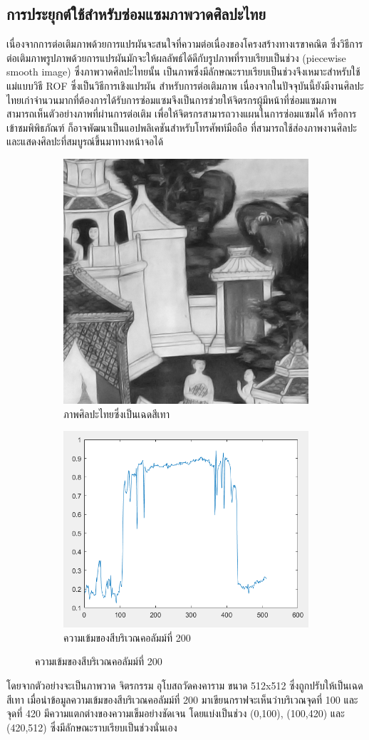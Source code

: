 \documentclass[hidelinks,a4paper,14pt]{article}
\numberwithin{equation}{section}							%
\begin{document}
{		 \subsection{การประยุกต์ใช้สำหรับซ่อมแซมภาพวาดศิลปะไทย}
		 
		 \hspace{1cm}เนื่องจากการต่อเติมภาพด้วยการแปรผันจะสนใจที่ความต่อเนื่องของโครงสร้างทางเรขาคณิต ซึ่งวิธีการต่อเติมภาพรูปภาพด้วยการแปรผันมักจะให้ผลลัพธ์ได้ดีกับรูปภาพที่ราบเรียบเป็นช่วง (piecewise smooth image) \cite{ref:defination-of-variation-inpaint}  ซึ่งภาพวาดศิลปะไทยนั้น เป็นภาพซึ่งมีลักษณะราบเรียบเป็นช่วงจึงเหมาะสำหรับใช้แม่แบบวิธี ROF ซึ่งเป็นวิธีการเชิงแปรผัน สำหรับการต่อเติมภาพ เนื่องจากในปัจจุบันนี้ยังมีงานศิลปะไทยเก่าจำนวนมากที่ต้องการได้รับการซ่อมแซมจึงเป็นการช่วยให้จิตรกรผู้มีหน้าที่ซ่อมแซมภาพ สามารถเห็นตัวอย่างภาพที่ผ่านการต่อเติม เพื่อให้จิตรกรสามารถวางแผนในการซ่อมแซมได้ หรือการเข้าชมพิพิธภัณฑ์ ก็อาจพัฒนาเป็นแอปพลิเคชันสำหรับโทรศัพท์มือถือ ที่สามารถใช้ส่องภาพงานศิลปะและแสดงศิลปะที่สมบูรณ์ขึ้นมาทางหน้าจอได้
		 \begin{figure}[H]
		 	\centering
		 	\begin{subfigure}{0.4\linewidth}
		 		\centering
		 		\includegraphics[width=0.4\linewidth]{images/show_peicewise/thaiart_gray.png}
		 		\caption{ภาพศิลปะไทยซึ่งเป็นเฉดสีเทา}
		 	\end{subfigure}
		 	\begin{subfigure}{0.4\linewidth}
		 		\centering
		 		\includegraphics[width=0.4\linewidth]{images/show_peicewise/thaiart_is_piecewise.png}
		 		\caption{ความเข้มของสีบริเวณคอลัมม์ที่ 200}
		 	\end{subfigure}				
		 \end{figure}
		 โดยจากตัวอย่างจะเป็นภาพวาด จิตรกรรม อุโบสถวัดคงคาราม ขนาด 512x512 ซึ่งถูกปรับให้เป็นเฉดสีเทา เมื่อนำข้อมูลความเข้มของสีบริเวณคอลัมม์ที่ 200 มาเขียนกราฟจะเห็นว่าบริเวณจุดที่ 100 และจุดที่ 420 มีความแตกต่างของความเข็มอย่างชัดเจน โดยแบ่งเป็นช่วง (0,100), (100,420) และ (420,512) ซึ่งมีลักษณะราบเรียบเป็นช่วงนั่นเอง
		 

}
\end{document}
